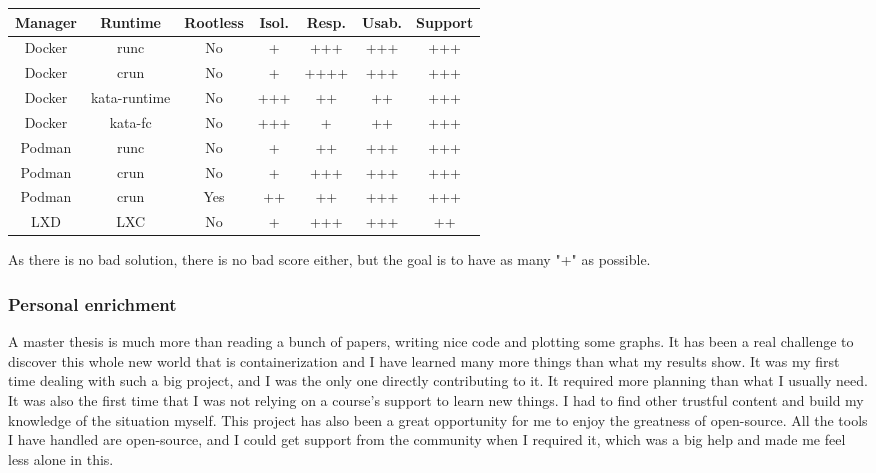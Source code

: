 \begin{center}
  \begin{tabular}{|ccc|c|c|c|c|}
    \hline
    \textbf{Manager} & \textbf{Runtime} & \textbf{Rootless} & \textbf{Isol.}\footnotemark & \textbf{Resp.}\footnotemark & \textbf{Usab.}\footnotemark & \textbf{Support} \\
    \hline
    \hline
    Docker & runc & No & + & +++ & +++ & +++ \\
    Docker & crun & No & + & ++++ & +++ & +++\\
    Docker & kata-runtime\footnotemark & No & +++ & ++ & ++ & +++\\
    Docker & kata-fc\footnotemark & No & +++ & + & ++ & +++\\
    Podman & runc & No & + & ++ & +++ & +++\\
    Podman & crun & No & + & +++ & +++ & +++\\
    Podman & crun & Yes & ++ & ++ & +++ & +++\\
    LXD & LXC & No & + & +++ & +++ & ++\\
    \hline
  \end{tabular}
\end{center}

As there is no bad solution, there is no bad score either, but the goal is to have as many "+" as possible.

\subsubsection{Personal enrichment}
A master thesis is much more than reading a bunch of papers, writing nice code and plotting some graphs.  It has been a real challenge to discover this whole new world that is containerization and I have learned many more things than what my results show.  It was my first time dealing with such a big project, and I was the only one directly contributing to it.  It required more planning than what I usually need.  It was also the first time that I was not relying on a course's support to learn new things. I had to find other trustful content and build my knowledge of the situation myself.  This project has also been a great opportunity for me to enjoy the greatness of open-source. All the tools I have handled are open-source, and I could get support from the community when I required it, which was a big help and made me feel less alone in this.

